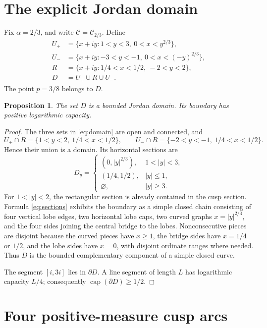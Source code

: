 \documentclass[10pt,reqno]{amsart}
\newtheorem{proposition}[theorem]{Proposition}
\theoremstyle{definition}
\newcommand{\cC}{\mathcal C}
\begin{document}
\section{The explicit Jordan domain}

Fix \(\alpha=2/3\), and write \(\cC=\cC_{2/3}\).  Define
\[
\begin{aligned}
 U_+&=\{x+iy:1<y<3,\ 0<x<y^{2/3}\},\\
 U_-&=\{x+iy:-3<y<-1,\ 0<x<(-y)^{2/3}\},\\
 R&=\{x+iy:1/4<x<1/2,\ -2<y<2\},\\
 D&=U_+\cup R\cup U_-.
\end{aligned}
\tag{2.1}\label{eq:domain}
\]
The point \(p=3/8\) belongs to \(D\).

\begin{proposition}\label{prop:jordan}
The set \(D\) is a bounded Jordan domain.  Its boundary has positive
logarithmic capacity.
\end{proposition}

\begin{proof}
The three sets in \cref{eq:domain} are open and connected, and
\[
 U_+\cap R=\{1<y<2,\ 1/4<x<1/2\},\qquad
 U_-\cap R=\{-2<y<-1,\ 1/4<x<1/2\}.
\]
Hence their union is a domain.  Its horizontal sections are
\[
 D_y=
 \begin{cases}
 (0,|y|^{2/3}),&1<|y|<3,\\
 (1/4,1/2),&|y|\leq1,\\
 \varnothing,&|y|\geq3.
 \end{cases}
\tag{2.2}\label{eq:sections}
\]
For \(1<|y|<2\), the rectangular section is already contained in the
cusp section.  Formula \cref{eq:sections} exhibits the boundary as a simple
closed chain consisting of four vertical lobe edges, two horizontal lobe
caps, two curved graphs \(x=|y|^{2/3}\), and the four sides joining the
central bridge to the lobes.  Nonconsecutive pieces are disjoint because the
curved pieces have \(x\geq1\), the bridge sides have \(x=1/4\) or \(1/2\),
and the lobe sides have \(x=0\), with disjoint ordinate ranges where needed.
Thus \(D\) is the bounded complementary component of a simple closed curve.

The segment \([i,3i]\) lies in \(\partial D\).  A line segment of length
\(L\) has logarithmic capacity \(L/4\); consequently
\(\operatorname{cap}(\partial D)\geq1/2\).
\end{proof}

\section{Four positive-measure cusp arcs}
\end{document}
